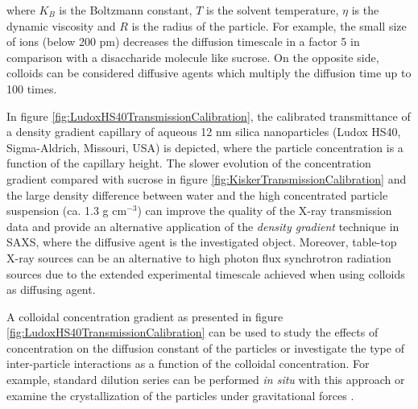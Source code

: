 where $K_B$ is the Boltzmann constant, $T$ is the solvent temperature, $\eta$ is the dynamic viscosity and $R$ is the radius of the particle. For example, the small size of ions (below 200 pm) decreases the diffusion timescale in a factor 5 in comparison with a disaccharide molecule like sucrose. On the opposite side, colloids can be considered diffusive agents which multiply the diffusion time up to 100 times. 

\begin{figure*}%
	\centering
		
		\caption[Concentration gradient of 12 nm silica particles measured at 8000 eV.]{Concentration gradient of 12 nm silica particles measured at 8000 eV. The large size of the colloids in comparison to a saccharide molecule provides a longer diffusion time than a typical contrast agent like sucrose.}
		\label{fig:LudoxHS40TransmissionCalibration}
\end{figure*}

In figure \ref{fig:LudoxHS40TransmissionCalibration}, the calibrated transmittance of a density gradient capillary of aqueous 12 nm silica nanoparticles (Ludox HS40, Sigma-Aldrich, Missouri, USA) is depicted, where the particle concentration is a function of the capillary height. The slower evolution of the concentration gradient compared with sucrose in figure \ref{fig:KiskerTransmissionCalibration} and the large density difference between water and the high concentrated particle suspension (ca. 1.3 g cm$^{-3}$) can improve the quality of the X-ray transmission data and provide an alternative application of the \emph{density gradient} technique in SAXS, where the diffusive agent is the investigated object. Moreover, table-top X-ray sources can be an alternative to high photon flux synchrotron radiation sources due to the extended experimental timescale achieved when using colloids as diffusing agent.

A colloidal concentration gradient as presented in figure \ref{fig:LudoxHS40TransmissionCalibration} can be used to study the effects of concentration on the diffusion constant of the particles or investigate the type of inter-particle interactions as a function of the colloidal concentration. For example, standard dilution series can be performed \emph{in situ} with this approach or examine the crystallization of the particles under gravitational forces \citep{hellsing_structure_2012}. 
